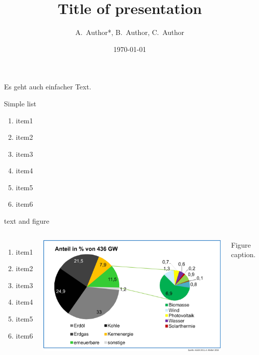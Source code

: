 \documentclass[final]{beamer} %
\title{Title of presentation }
\author[Author]{A.~Author\inst{1}*, B.~Author\inst{2}, C.~Author\inst{3}}
\institute[]{%
     \inst{1}Max Planck Institute for Plasma Physics, Boltzmannstr., D-85748 Garching, Germany, 
     \inst{2}Institute 2, street2, town2, country2, 
	 \inst{3}Institute 3, street3, town3, country3 
     }
\date{\today}
\begin{document}
  \begin{frame}
  \frametitle{}
Es geht auch einfacher Text.
    \begin{kasten}{\large Simple list}
      \begin{enumerate}
        \item item1
        \item item2
        \item item3
        \item item4
        \item item5
        \item item6
      \end{enumerate}
    \end{kasten}
    \begin{kasten}{\large text and figure}
    \begin{columns}
      \begin{enumerate}
        \item item1
        \item item2
        \item item3
        \item item4
        \item item5
        \item item6
      \end{enumerate}\hfill
    \includegraphics[width=.7\textwidth]{primaerenergieverbrauch_dt_2013}\par
    Figure caption.
    \end{columns}
    \end{kasten}
		

\end{frame}
\end{document}
